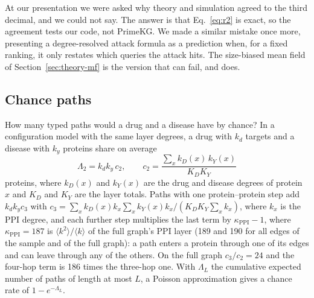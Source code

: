 At our presentation we were asked why theory and simulation agreed to the third
decimal, and we could not say. The answer is that Eq.~\eqref{eq:r2} is exact, so
the agreement tests our code, not PrimeKG. We made a similar mistake once more,
presenting a degree-resolved attack formula as a prediction when, for a fixed
ranking, it only restates which queries the attack hits. The size-biased mean
field of Section~\ref{sec:theory-mf} is the version that can fail, and does.


\subsection{Chance paths}
\label{sec:theory-chance}

How many typed paths would a drug and a disease have by chance? In a
configuration model with the same layer degrees, a drug with $k_d$ targets and a
disease with $k_y$ proteins share on average
\begin{equation}
\Lambda_2 = k_d k_y\, c_2,\qquad c_2=\frac{\sum_x k_D(x)\,k_Y(x)}{K_D K_Y}
\label{eq:cm}
\end{equation}
proteins, where $k_D(x)$ and $k_Y(x)$ are the drug and disease degrees of
protein $x$ and $K_D$ and $K_Y$ are the layer totals. Paths with one
protein--protein step add $k_d k_y c_3$ with
$c_3=\sum_x k_D(x)k_x\sum_x k_Y(x)k_x/(K_D K_Y \sum_x k_x)$, where $k_x$ is the
PPI degree, and each further step multiplies the last term by
$\kappa_{\mathrm{PPI}}-1$, where $\kappa_{\mathrm{PPI}}=187$ is
$\langle k^2\rangle/\langle k\rangle$ of the full graph's PPI layer (189 and 190
for all edges of the sample and of the full graph): a path
enters a protein through one of its edges and can leave through any of the
others. On the full graph $c_3/c_2=24$ and the four-hop term is 186 times the
three-hop one. With $\Lambda_L$ the cumulative expected number of paths of
length at most $L$, a Poisson approximation gives a chance rate of
$1-e^{-\Lambda_L}$.


